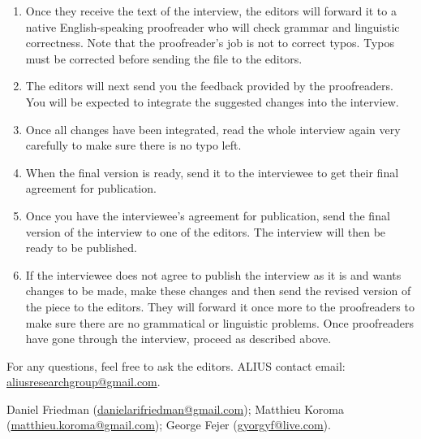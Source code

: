 \documentclass[11pt]{article}
\begin{document}
\begin{enumerate}
\begin{itemize}[label=\textendash,leftmargin=1.5em]
  \item Make sure there is no space before punctuation marks such as semicolons, colons, commas, periods, exclamation marks, or question marks.
  \item Dashes used for punctuation must be em dashes and not en dashes, and they must not be separated by spaces. For example: ``the concept of consciousness---thus defined---proves difficult.''
  \item Before sending the file to the editors, take time to carefully go through the interview to make sure there is no typo.
  \end{itemize}
\item Once they receive the text of the interview, the editors will forward it to a native English-speaking proofreader who will check grammar and linguistic correctness. Note that the proofreader's job is not to correct typos. Typos must be corrected before sending the file to the editors.
\item The editors will next send you the feedback provided by the proofreaders. You will be expected to integrate the suggested changes into the interview.
\item Once all changes have been integrated, read the whole interview again very carefully to make sure there is no typo left.
\item When the final version is ready, send it to the interviewee to get their final agreement for publication.
\item Once you have the interviewee's agreement for publication, send the final version of the interview to one of the editors. The interview will then be ready to be published.
\item If the interviewee does not agree to publish the interview as it is and wants changes to be made, make these changes and then send the revised version of the piece to the editors. They will forward it once more to the proofreaders to make sure there are no grammatical or linguistic problems. Once proofreaders have gone through the interview, proceed as described above.
\end{enumerate}


For any questions, feel free to ask the editors. ALIUS contact email: \href{mailto:aliusresearchgroup@gmail.com}{aliusresearchgroup@gmail.com}.

Daniel Friedman (\href{mailto:danielarifriedman@gmail.com}{danielarifriedman@gmail.com}); Matthieu Koroma (\href{mailto:matthieu.koroma@gmail.com}{matthieu.koroma@gmail.com}); George Fejer (\href{mailto:gyorgyf@live.com}{gyorgyf@live.com}).
\end{document}
